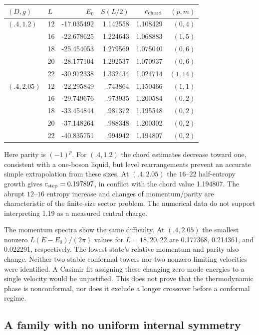 \documentclass[11pt]{article}
\begin{document}
\begin{center}
\begin{tabular}{llrrrr}
\toprule
$(D,g)$ & $L$ & $E_0$ & $S(L/2)$ & $c_{\rm chord}$ & $(p,m)$\\
\midrule
$(.4,1.2)$ & 12 & -17.035492 & 1.142558 & 1.108429 & $(0,4)$\\
 & 16 & -22.678625 & 1.224643 & 1.068883 & $(1,5)$\\
 & 18 & -25.454053 & 1.279569 & 1.075040 & $(0,6)$\\
 & 20 & -28.177104 & 1.292537 & 1.070937 & $(0,6)$\\
 & 22 & -30.972338 & 1.332434 & 1.024714 & $(1,14)$\\
\midrule
$(.4,2.05)$ & 12 & -22.295849 & .743864 & 1.150466 & $(1,1)$\\
 & 16 & -29.749676 & .973935 & 1.200584 & $(0,2)$\\
 & 18 & -33.454844 & .981372 & 1.195548 & $(0,2)$\\
 & 20 & -37.148264 & .988348 & 1.200302 & $(0,2)$\\
 & 22 & -40.835751 & .994942 & 1.194807 & $(0,2)$\\
\bottomrule
\end{tabular}
\end{center}
Here parity is $(-1)^p$. For $(.4,1.2)$ the chord estimates decrease toward
one, consistent with a one-boson liquid, but level rearrangements prevent
an accurate simple extrapolation from these sizes. At $(.4,2.05)$ the
$16$--$22$ half-entropy growth gives $c_{\rm step}=0.197897$, in conflict
with the chord value 1.194807. The abrupt $12$--$16$ entropy increase and
changes of momentum/parity are characteristic of the finite-size sector
problem. The numerical data do not support interpreting 1.19 as a measured
central charge.

The momentum spectra show the same difficulty. At $(.4,2.05)$ the smallest
nonzero $L(E-E_0)/(2\pi)$ values for $L=18,20,22$ are 0.177368, 0.214361,
and 0.022291, respectively. The lowest state's relative momentum and parity
also change. Neither two stable conformal towers nor two nonzero limiting
velocities were identified. A Casimir fit assigning these changing
zero-mode energies to a single velocity would be unjustified. This does not
prove that the thermodynamic phase is nonconformal, nor does it exclude a
longer crossover before a conformal regime.

\subsection{A family with no uniform internal symmetry}
\end{document}
